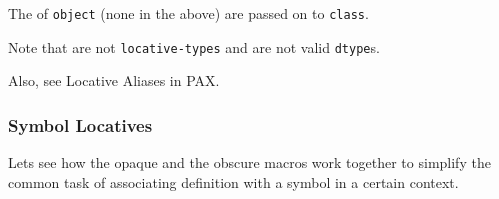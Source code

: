 \begin{itemize}
\begin{Shaded}
\begin{Highlighting}[]
 \NormalTok{)}
\end{Highlighting}
\end{Shaded}

  The
  of \texttt{object} (none in the above) are passed on to
  \texttt{class}.

\begin{Shaded}
\begin{Highlighting}[]
 \NormalTok{))}
\OperatorTok{=\textgreater{}}
\OperatorTok{=\textgreater{}}
\end{Highlighting}
\end{Shaded}

  Note that
  are not \texttt{locative-types} and are not valid \texttt{dtype}s.

  Also, see Locative Aliases in PAX.
\end{itemize}

\subsubsection{Symbol Locatives}\label{symbol-locatives}

\label{x-28DREF-EXT-3A-40SYMBOL-LOCATIVES-20MGL-PAX-3ASECTION-29}

Let\textquotesingle s see how the opaque
and the obscure
macros work together to simplify the common task of associating
definition with a symbol in a certain context.

